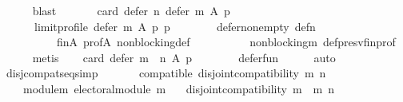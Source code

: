 \begin{isabellebody}
\ \ \ \ \isamarkupfalse%
\ blast\isanewline
\ \ \isamarkupfalse%
\isanewline
\ \ \ \ {\isachardoublequoteopen}card\ {\isacharparenleft}{\kern0pt}defer\ n\ {\isacharparenleft}{\kern0pt}defer\ m\ A\ p{\isacharparenright}{\kern0pt}\isanewline
\ \ \ \ \ \ {\isacharparenleft}{\kern0pt}limit{\isacharunderscore}{\kern0pt}profile\ {\isacharparenleft}{\kern0pt}defer\ m\ A\ p{\isacharparenright}{\kern0pt}\ p{\isacharparenright}{\kern0pt}{\isacharparenright}{\kern0pt}\ {\isacharequal}{\kern0pt}\ {}{\isachardoublequoteclose}\isanewline
\ \ \ \ \isamarkupfalse%
\ defer{\isacharunderscore}{\kern0pt}non{\isacharunderscore}{\kern0pt}empty\ def{\isacharunderscore}{\kern0pt}{}{\isacharunderscore}{\kern0pt}n\isanewline
\ \ \ \ \ \ \ \ \ \ fin{\isacharunderscore}{\kern0pt}A\ prof{\isacharunderscore}{\kern0pt}A\ non{\isacharunderscore}{\kern0pt}blocking{\isacharunderscore}{\kern0pt}def\isanewline
\ \ \ \ \ \ \ \ \ \ non{\isacharunderscore}{\kern0pt}blocking{\isacharunderscore}{\kern0pt}m\ def{\isacharunderscore}{\kern0pt}presv{\isacharunderscore}{\kern0pt}fin{\isacharunderscore}{\kern0pt}prof\isanewline
\ \ \ \ \isamarkupfalse%
\ metis\isanewline
\ \ \isamarkupfalse%
\ {\isachardoublequoteopen}card\ {\isacharparenleft}{\kern0pt}defer\ {\isacharparenleft}{\kern0pt}m\ {\isasymtriangleright}\ n{\isacharparenright}{\kern0pt}\ A\ p{\isacharparenright}{\kern0pt}\ {\isacharequal}{\kern0pt}\ {}{\isachardoublequoteclose}\isanewline
\ \ \ \ \isamarkupfalse%
\ defer{\isacharunderscore}{\kern0pt}fun\isanewline
\ \ \ \ \isamarkupfalse%
\ auto\isanewline
{}\isamarkupfalse%
%
\endisatagproof
{\isafoldproof}%
%
\isadelimproof
\isanewline
%
\endisadelimproof
\isanewline
\isanewline
{}\isamarkupfalse%
\ disj{\isacharunderscore}{\kern0pt}compat{\isacharunderscore}{\kern0pt}seq{\isacharbrackleft}{\kern0pt}simp{\isacharbrackright}{\kern0pt}{\isacharcolon}{\kern0pt}\isanewline
\ \ \isanewline
\ \ \ \ compatible{\isacharcolon}{\kern0pt}\ {\isachardoublequoteopen}disjoint{\isacharunderscore}{\kern0pt}compatibility\ m\ n{\isachardoublequoteclose}\ \isanewline
\ \ \ \ module{\isacharunderscore}{\kern0pt}m{}{\isacharcolon}{\kern0pt}\ {\isachardoublequoteopen}electoral{\isacharunderscore}{\kern0pt}module\ m{}{\isachardoublequoteclose}\isanewline
\ \ \ {\isachardoublequoteopen}disjoint{\isacharunderscore}{\kern0pt}compatibility\ {\isacharparenleft}{\kern0pt}m\ {\isasymtriangleright}\ m{}{\isacharparenright}{\kern0pt}\ n{\isachardoublequoteclose}\isanewline

\end{isabellebody}
